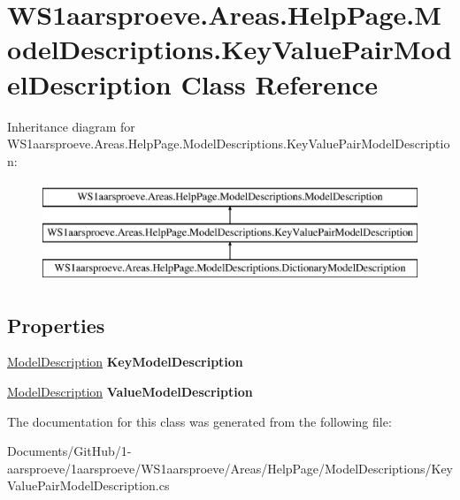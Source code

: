 \hypertarget{class_w_s1aarsproeve_1_1_areas_1_1_help_page_1_1_model_descriptions_1_1_key_value_pair_model_description}{}\section{W\+S1aarsproeve.\+Areas.\+Help\+Page.\+Model\+Descriptions.\+Key\+Value\+Pair\+Model\+Description Class Reference}
\label{class_w_s1aarsproeve_1_1_areas_1_1_help_page_1_1_model_descriptions_1_1_key_value_pair_model_description}
Inheritance diagram for W\+S1aarsproeve.\+Areas.\+Help\+Page.\+Model\+Descriptions.\+Key\+Value\+Pair\+Model\+Description\+:\begin{figure}[H]
\begin{center}
\leavevmode
\includegraphics[height=3.000000cm]{class_w_s1aarsproeve_1_1_areas_1_1_help_page_1_1_model_descriptions_1_1_key_value_pair_model_description}
\end{center}
\end{figure}
\subsection*{Properties}
\begin{DoxyCompactItemize}
\item 
\hypertarget{class_w_s1aarsproeve_1_1_areas_1_1_help_page_1_1_model_descriptions_1_1_key_value_pair_model_description_a2a617ce29b098778362522a937309cac}{}\hyperlink{class_w_s1aarsproeve_1_1_areas_1_1_help_page_1_1_model_descriptions_1_1_model_description}{Model\+Description} {\bfseries Key\+Model\+Description}\label{class_w_s1aarsproeve_1_1_areas_1_1_help_page_1_1_model_descriptions_1_1_key_value_pair_model_description_a2a617ce29b098778362522a937309cac}

\item 
\hypertarget{class_w_s1aarsproeve_1_1_areas_1_1_help_page_1_1_model_descriptions_1_1_key_value_pair_model_description_ab05ac94bb96df298ee4d7fcc1110b877}{}\hyperlink{class_w_s1aarsproeve_1_1_areas_1_1_help_page_1_1_model_descriptions_1_1_model_description}{Model\+Description} {\bfseries Value\+Model\+Description}\label{class_w_s1aarsproeve_1_1_areas_1_1_help_page_1_1_model_descriptions_1_1_key_value_pair_model_description_ab05ac94bb96df298ee4d7fcc1110b877}

\end{DoxyCompactItemize}


The documentation for this class was generated from the following file\+:\begin{DoxyCompactItemize}
\item 
Documents/\+Git\+Hub/1-\/aarsproeve/1aarsproeve/\+W\+S1aarsproeve/\+Areas/\+Help\+Page/\+Model\+Descriptions/Key\+Value\+Pair\+Model\+Description.\+cs\end{DoxyCompactItemize}

